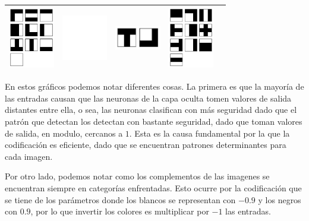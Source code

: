 \documentclass[12pt]{article}
\begin{document}
\begin{center}
\begin{tabular}{| c | c | c | c | c |}
     \includegraphics[width=2cm]{graficosde3neuronas/atributo4Clase0} &
     \includegraphics[width=2cm]{graficosde3neuronas/atributo4Clase1} &
     \includegraphics[width=2cm]{graficosde3neuronas/atributo4Clase2} &
     \includegraphics[width=2cm]{graficosde3neuronas/atributo4Clase3} \\ \hline
   \end{tabular}
 \end{center}

En estos gráficos podemos notar diferentes cosas. La primera es que la mayoría de las entradas causan que las neuronas de la capa oculta tomen valores de salida distantes entre ella, o sea, las neuronas clasifican con más seguridad dado que el patrón que detectan los detectan con bastante seguridad, dado que toman valores de salida, en modulo, cercanos a $1$. Esta es la causa fundamental por la que la codificación es eficiente, dado que se encuentran patrones determinantes para cada imagen.

Por otro lado, podemos notar como los complementos de las imagenes se encuentran siempre en categorías enfrentadas. Esto ocurre por la codificación que se tiene de los parámetros donde los blancos se representan con $-0.9$ y los negros con $0.9$, por lo que invertir los colores es multiplicar por $-1$ las entradas.
\end{document}
